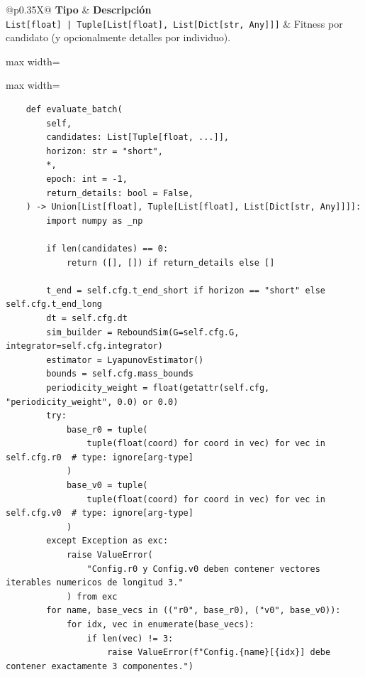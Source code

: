 \begin{table}[H]
  \centering
  \caption{Valor de retorno de \texttt{evaluate\_batch}}
  \small
  \begin{tabularx}{\textwidth}{@{}p{0.35\textwidth}X@{}}
    \toprule
    \textbf{Tipo} & \textbf{Descripción} \\
    \midrule
    \texttt{List[float] | Tuple[List[float], List[Dict[str, Any]]]} & Fitness por candidato (y opcionalmente detalles por individuo).\\
    \bottomrule
  \end{tabularx}
\end{table}

\begin{listing}[H]
\caption{Bloque de código de \texttt{evaluate\_batch}}
\begin{adjustbox}{max width=\textwidth}
\begin{minipage}{\linewidth}
{
\begin{adjustbox}{max width=\textwidth}
\begin{minipage}{\textwidth}
\begin{verbatim}
    def evaluate_batch(
        self,
        candidates: List[Tuple[float, ...]],
        horizon: str = "short",
        *,
        epoch: int = -1,
        return_details: bool = False,
    ) -> Union[List[float], Tuple[List[float], List[Dict[str, Any]]]]:
        import numpy as _np

        if len(candidates) == 0:
            return ([], []) if return_details else []

        t_end = self.cfg.t_end_short if horizon == "short" else self.cfg.t_end_long
        dt = self.cfg.dt
        sim_builder = ReboundSim(G=self.cfg.G, integrator=self.cfg.integrator)
        estimator = LyapunovEstimator()
        bounds = self.cfg.mass_bounds
        periodicity_weight = float(getattr(self.cfg, "periodicity_weight", 0.0) or 0.0)
        try:
            base_r0 = tuple(
                tuple(float(coord) for coord in vec) for vec in self.cfg.r0  # type: ignore[arg-type]
            )
            base_v0 = tuple(
                tuple(float(coord) for coord in vec) for vec in self.cfg.v0  # type: ignore[arg-type]
            )
        except Exception as exc:
            raise ValueError(
                "Config.r0 y Config.v0 deben contener vectores iterables numericos de longitud 3."
            ) from exc
        for name, base_vecs in (("r0", base_r0), ("v0", base_v0)):
            for idx, vec in enumerate(base_vecs):
                if len(vec) != 3:
                    raise ValueError(f"Config.{name}[{idx}] debe contener exactamente 3 componentes.")


\end{verbatim}
\end{minipage}
\end{adjustbox}}
\end{minipage}
\end{adjustbox}
\end{listing}
